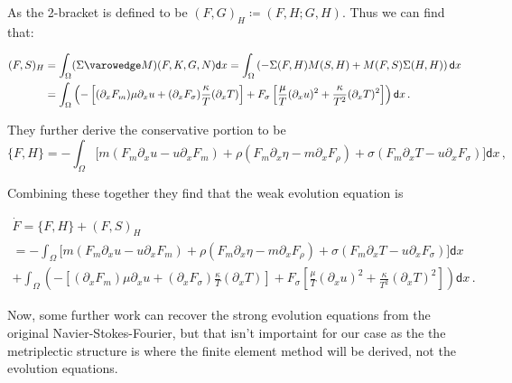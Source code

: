 As the 2-bracket is defined to be $(F,G)_H \coloneqq (F,H; G,H)$. Thus we can find that:

\begin{equation} \label{eq:dissipative_flow}
\begin{aligned}
    (F, S)_H
    &=
    \int_\Omega
    (\Sigma \varowedge M)(F, K, G, N)
    \mathsf{d} x
    =
    \int_\Omega
    \left(
    - \Sigma(F, H) M(S, H)
    + M(F, S) \Sigma(H, H)
    \right)
    \mathsf{d} x \\
    &=
    \int_\Omega
    \left(
    -
    \left[
     (\partial_x F_m) \mu \partial_x u
    +
    (\partial_x F_\sigma) \frac{\kappa}{T} (\partial_x T)
    \right]
    +
    F_\sigma
    \left[
    \frac{\mu}{T} (\partial_x u)^2
    +
    \frac{\kappa}{T^2} (\partial_x T)^2
    \right]
    \right)
    \mathsf{d} x \,.
\end{aligned}
\end{equation}


They further derive the conservative portion to be
\begin{equation}
    \{F, H\}
    =
    - \int_\Omega
    \bigg[
    m \left(
    F_m \partial_x u
    -
    u \partial_x F_m
    \right)
    +
    \rho \left(
    F_m \partial_x \eta
    -
    m \partial_x F_{\rho}
    \right)
    +
    \sigma \left(
    F_m \partial_x T
    -
    u \partial_x F_{\sigma}
    \right)
    \bigg]
    \mathsf{d} x \,,
\end{equation}

Combining these together they find that the weak evolution equation is

\begin{multline} \label{eq:weak_nsf_system}
    \dot{F}
    =
    \{F, H\} + (F, S)_H \\
    =
    - \int_\Omega
    \bigg[
    m \left(
    F_m \partial_x u
    -
    u \partial_x F_m
    \right)
    +
    \rho \left(
    F_m \partial_x \eta
    -
    m \partial_x F_{\rho}
    \right)
    +
    \sigma \left(
    F_m \partial_x T
    -
    u \partial_x F_{\sigma}
    \right)
    \bigg]
    \mathsf{d} x \\
    +
    \int_\Omega
    \left(
    -
    \left[
     (\partial_x F_m) \mu \partial_x u
    +
    (\partial_x F_\sigma) \frac{\kappa}{T} (\partial_x T)
    \right]
    +
    F_\sigma
    \left[
    \frac{\mu}{T} (\partial_x u)^2
    +
    \frac{\kappa}{T^2} (\partial_x T)^2
    \right]
    \right)
    \mathsf{d} x \,.
\end{multline}

Now, some further work can recover the strong evolution equations from the original Navier-Stokes-Fourier, but that isn't importaint for our case as the the metriplectic structure is where the finite element method will be derived, not the evolution equations.

